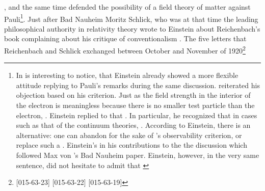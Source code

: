 \documentclass[draft]{article}
\renewcommand{\me}{;~m.e.{}}
\begin{document}
{}, and the same time defended the possibility of a field theory of matter against Pauli\footnote{In is interesting to notice, that Einstein already showed a more flexible attitude replying to Pauli's remarks during the same discussion. \Pauli reiterated his objection based on his  criterion. Just as the field strength in the interior of the electron is meaningless because there is no smaller test particle than the electron,  \citep[650]{Einstein1920c}. Einstein replied to \Pauli that  \citep[650]{Einstein1920c}. In particular, he recognized that in cases such as that of the continuum theories,  \citep[650]{Einstein1920c}. According to Einstein, there is an alternative: one can abandon  for the sake of \Pauli's observability criterion, or replace such a  \citep[650]{Einstein1920c}.  Einstein's in his contributions to the the discussion which followed Max von 's Bad Nauheim paper. Einstein, however, in the very same sentence, did not hesitate to admit that  \citep[Einstein's reply to][662\me]{Laue1920}}.  Just after Bad Nauheim Moritz Schlick, who was at that time the leading philosophical authority in relativity theory wrote to Einstein about Reichenbach's book complaining about his critique of conventionalism . The five letters that Reichenbach and Schlick exchanged between October and November of 1920\footnote{[015-63-23]
[015-63-22]
[015-63-19]
}
\end{document}
